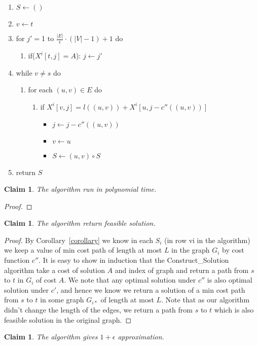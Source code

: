 \documentclass{article}
\newtheorem{claim}[section]{Claim}
\begin{document}
\begin{enumerate}
\begin{enumerate}[I]
	\item $S\leftarrow ()$
	\item $v\leftarrow t$
	\item for $j' = $1 to $ \frac{|E|}{\epsilon} \cdot (|V|-1) +1$ do
	\begin{enumerate}\item if($X^i[t,j] = A$): $j\leftarrow j'$
\end{enumerate}
	\item while $v\ne s$ do
	\begin{enumerate}
		\item for each $(u,v)\in E$ do
		\begin{enumerate}
			\item if $ X^i[v,j] = l((u,v)) + X^i[u,j-c''((u,v))]$
			\begin{itemize}
				\item $j\leftarrow j-c''((u,v))$
				\item $v \leftarrow u$
				\item $S\leftarrow (u,v)\circ S$
			\end{itemize}
		\end{enumerate}
	\end{enumerate}
	\item return $S$
\end{enumerate}
\begin{claim} The algorithm run in polynomial time.
\end{claim}
\begin{proof}
	
\end{proof}
\begin{claim} The algorithm return feasible solution.
\end{claim}

\begin{proof}
By Corollary~\ref{corollary} we know in each $S_i$ (in row vi in the algorithm) we keep a value of min cost path of length at most $L$ in the graph $G_i$ by cost function $c''$. It is easy to show in induction that the Construct\_Solution algorithm take a cost of solution $A$ and index of graph and return a path from $s$ to $t$ in $G_i$ of cost $A$. We note that any optimal solution under $c''$ is also optimal solution under $c'$, and hence we know we return a solution of a min cost path from $s$ to $t$ in some graph $G_{i*}$ of length at most $L$.
Note that as our algorithm didn't change the length of the edges, we return a path from $s$ to $t$ which is also feasible solution in the original graph.
\end{proof}
\begin{claim} The algorithm gives $1+\epsilon$ approximation.
\end{claim}


\end{enumerate}
\end{document}
